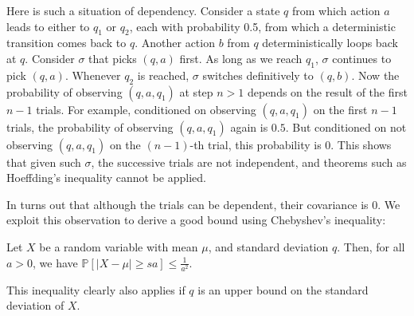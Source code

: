 \documentclass[a4paper,USenglish,cleveref, autoref, thm-restate]{lipics-v2021}
\def\abs#1{\ensuremath{\lvert #1 \rvert}}
\newcommand*{\pr}{\mathbb{P}}
\begin{document}
Here is such a situation of dependency. 
Consider a state $q$ from which action $a$ leads to either to $q_1$ or $q_2$, each with probability 0.5, from which a deterministic transition comes back to $q$.
Another action $b$ from $q$ deterministically loops back at $q$.
Consider $\sigma$ that picks $(q,a)$ first. As long as we reach $q_1$, $\sigma$ continues to pick $(q,a)$. Whenever $q_2$ is reached, $\sigma$ switches definitively to $(q,b)$.
Now the probability of observing $(q,a,q_1)$ at step $n>1$ depends on the result of the first $n-1$ trials. 
For example, conditioned on 
observing $(q,a,q_1)$ on the first $n-1$ trials, the probability of observing $(q,a,q_1)$ again is $0.5$.
But conditioned on not observing $(q,a,q_1)$ on the $(n-1)$-th trial, this probability is $0$. This shows that given such $\sigma$, the successive trials are not independent,
and theorems such as Hoeffding's inequality cannot be applied.


In turns out that although the trials can be dependent, their covariance is 0. We exploit this observation to derive a good bound using
Chebyshev's inequality:
\begin{theorem}
  \label{thm:chebyshev}
  Let $X$ be a random variable with mean $\mu$, and standard deviation $q$. Then, for all $a>0$, we have
  \(
    \pr[ \abs{X-\mu} \geq s a ] \leq \frac{1}{a^2}.
  \)
\end{theorem}
This inequality clearly also applies if $q$ is an upper bound on the standard deviation of $X$.
\end{document}

